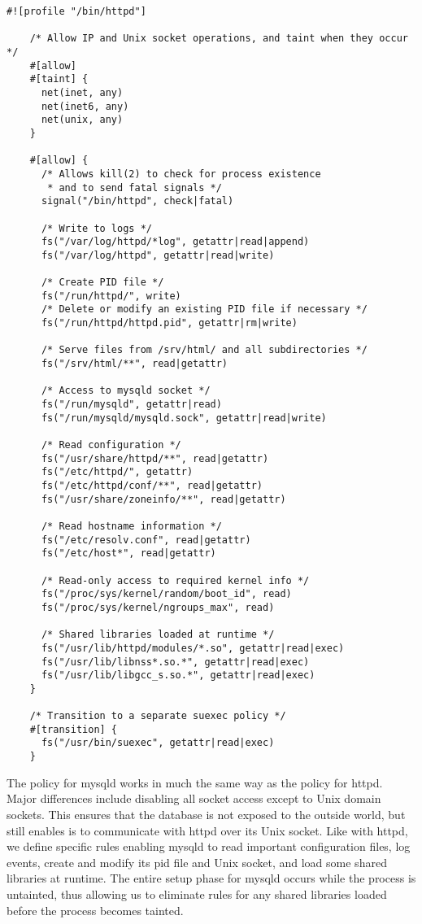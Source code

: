 \begin{lstlisting}[language=bpfbox, gobble=4, float=false, caption={[A \bpfbox{} policy for Apache httpd]
  A \bpfbox{} policy for Apache httpd.
  %\todo{Describe this}
}, label={lst:bpfbox-apache}]
    #![profile "/bin/httpd"]

    /* Allow IP and Unix socket operations, and taint when they occur */
    #[allow]
    #[taint] {
      net(inet, any)
      net(inet6, any)
      net(unix, any)
    }

    #[allow] {
      /* Allows kill(2) to check for process existence
       * and to send fatal signals */
      signal("/bin/httpd", check|fatal)

      /* Write to logs */
      fs("/var/log/httpd/*log", getattr|read|append)
      fs("/var/log/httpd", getattr|read|write)

      /* Create PID file */
      fs("/run/httpd/", write)
      /* Delete or modify an existing PID file if necessary */
      fs("/run/httpd/httpd.pid", getattr|rm|write)

      /* Serve files from /srv/html/ and all subdirectories */
      fs("/srv/html/**", read|getattr)

      /* Access to mysqld socket */
      fs("/run/mysqld", getattr|read)
      fs("/run/mysqld/mysqld.sock", getattr|read|write)

      /* Read configuration */
      fs("/usr/share/httpd/**", read|getattr)
      fs("/etc/httpd/", getattr)
      fs("/etc/httpd/conf/**", read|getattr)
      fs("/usr/share/zoneinfo/**", read|getattr)

      /* Read hostname information */
      fs("/etc/resolv.conf", read|getattr)
      fs("/etc/host*", read|getattr)

      /* Read-only access to required kernel info */
      fs("/proc/sys/kernel/random/boot_id", read)
      fs("/proc/sys/kernel/ngroups_max", read)

      /* Shared libraries loaded at runtime */
      fs("/usr/lib/httpd/modules/*.so", getattr|read|exec)
      fs("/usr/lib/libnss*.so.*", getattr|read|exec)
      fs("/usr/lib/libgcc_s.so.*", getattr|read|exec)
    }

    /* Transition to a separate suexec policy */
    #[transition] {
      fs("/usr/bin/suexec", getattr|read|exec)
    }
\end{lstlisting}

The \bpfbox{} policy for mysqld works in much the same way as the policy for httpd. Major
differences include disabling all socket access except to Unix domain sockets. This
ensures that the database is not exposed to the outside world, but still enables is to
communicate with httpd over its Unix socket. Like with httpd, we define specific rules
enabling mysqld to read important configuration files, log events, create and modify its
\gls{pid} file and Unix socket, and load some shared libraries at runtime. The entire
setup phase for mysqld occurs while the process is untainted, thus allowing us to
eliminate rules for any shared libraries loaded before the process becomes tainted.

